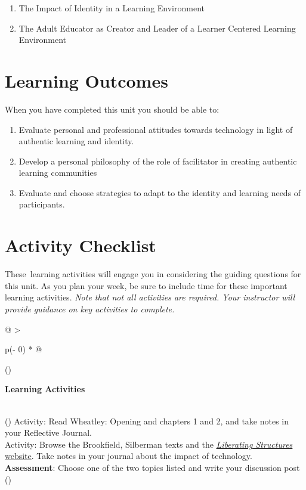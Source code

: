 \documentclass[
]{book}
\providecommand{\tightlist}{%
  \setlength{\itemsep}{0pt}\setlength{\parskip}{0pt}}
\begin{document}
\begin{enumerate}
\def\labelenumi{\arabic{enumi}.}
\tightlist
\item
  The Impact of Identity in a Learning Environment
\item
  The Adult Educator as Creator and Leader of a Learner Centered Learning Environment
\end{enumerate}

\hypertarget{learning-outcomes-5}{%
\section*{Learning Outcomes}\label{learning-outcomes-5}}

When you have completed this unit you should be able to:

\begin{enumerate}
\def\labelenumi{\arabic{enumi}.}
\tightlist
\item
  Evaluate personal and professional attitudes towards technology in light of authentic learning and identity.
\item
  Develop a personal philosophy of the role of facilitator in creating authentic learning communities
\item
  Evaluate and choose strategies to adapt to the identity and learning needs of participants.
\end{enumerate}

\hypertarget{activity-checklist-5}{%
\section*{Activity Checklist}\label{activity-checklist-5}}

These~learning activities will engage you in considering the guiding questions for this unit. As you plan your week, be sure to include time for these important learning activities. \emph{Note that not all activities are required. Your instructor will provide guidance on key activities to complete.}

\begin{longtable}[]{@{}
  >{\raggedright\arraybackslash}p{(\columnwidth - 0\tabcolsep) * }@{}}
\toprule()
\begin{minipage}[b]{\linewidth}\raggedright
\textbf{Learning Activities}
\end{minipage} \\
\midrule()
\endhead
Activity: Read Wheatley: Opening and chapters 1 and 2, and take notes in your Reflective Journal. \\
Activity: Browse the Brookfield, Silberman texts and the \href{http://www.liberatingstructures.com/ls-menu/}{\emph{Liberating Structures} website}. Take notes in your journal about the impact of technology. \\
\textbf{Assessment}: Choose one of the two topics listed and write your discussion post \\
\bottomrule()
\end{longtable}
\end{document}
